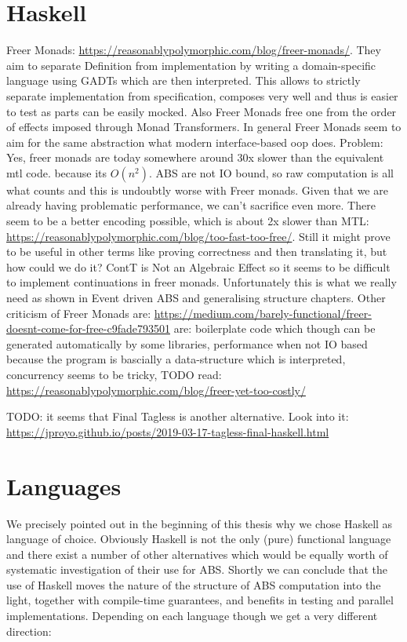 \section{Haskell}
Freer Monads: \url{https://reasonablypolymorphic.com/blog/freer-monads/}. They aim to separate Definition from implementation by writing a domain-specific language using GADTs which are then interpreted. This allows to strictly separate implementation from specification, composes very well and thus is easier to test as parts can be easily mocked. Also Freer Monads free one from the order of effects imposed through Monad Transformers. In general Freer Monads seem to aim for the same abstraction what modern interface-based oop does.
Problem: Yes, freer monads are today somewhere around 30x slower than the equivalent mtl code. because its $O(n^2)$. ABS are not IO bound, so raw computation is all what counts and this is undoubtly worse with Freer monads. Given that we are already having problematic performance, we can't sacrifice even more. There seem to be a better encoding possible, which is about 2x slower than MTL: \url{https://reasonablypolymorphic.com/blog/too-fast-too-free/}. Still it might prove to be useful in other terms like proving correctness and then translating it, but how could we do it?  
ContT is Not an Algebraic Effect so it seems to be difficult to implement continuations in freer monads. Unfortunately this is what we really need as shown in Event driven ABS and generalising structure chapters.
Other criticism of Freer Monads are: \url{https://medium.com/barely-functional/freer-doesnt-come-for-free-c9fade793501} are: boilerplate code which though can be generated automatically by some libraries, performance when not IO based because the program is bascially a data-structure which is interpreted, concurrency seems to be tricky, 
TODO read: \url{https://reasonablypolymorphic.com/blog/freer-yet-too-costly/}

TODO: it seems that Final Tagless is another alternative. Look into it: \url{https://jproyo.github.io/posts/2019-03-17-tagless-final-haskell.html}

\section{Languages}
We precisely pointed out in the beginning of this thesis why we chose Haskell as language of choice. Obviously Haskell is not the only (pure) functional language and there exist a number of other alternatives which would be equally worth of systematic investigation of their use for ABS. Shortly we can conclude that the use of Haskell moves the nature of the structure of ABS computation into the light, together with compile-time guarantees, and benefits in testing and parallel implementations. Depending on each language though we get a very different direction:

